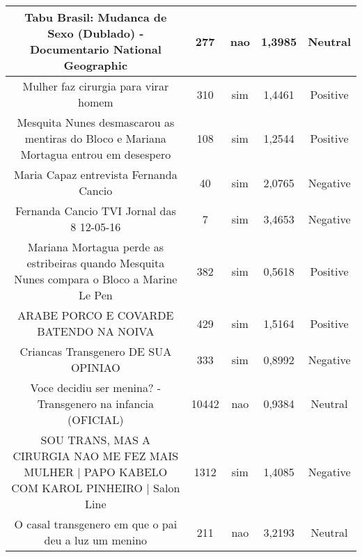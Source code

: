 \documentclass[11pt]{article}
\newlength\mylength
\begin{document}
\begin{center}
\begin{longtable}{||C{.40\mylength}||C{.20\mylength}||C{.20\mylength}||C{.30\mylength}||C{.20\mylength}||}
   Tabu Brasil: Mudanca de Sexo (Dublado) - Documentario National Geographic  & 277 & nao & 1,3985 & Neutral \\  \hline
   Mulher faz cirurgia para virar homem  & 310 & sim & 1,4461 & Positive \\  \hline
    Mesquita Nunes desmascarou as mentiras do Bloco e Mariana Mortagua entrou em desespero  & 108 & sim & 1,2544 & Positive \\  \hline
   Maria Capaz entrevista Fernanda Cancio  & 40 & sim & 2,0765 & Negative \\  \hline
  Fernanda Cancio TVI Jornal das 8 12-05-16  & 7 & sim & 3,4653 & Negative \\  \hline
  Mariana Mortagua perde as estribeiras quando Mesquita Nunes compara o Bloco a Marine Le Pen  & 382 & sim & 0,5618 & Positive \\  \hline
  ARABE PORCO E COVARDE BATENDO NA NOIVA & 429 & sim & 1,5164 & Positive \\  \hline
  Criancas Transgenero DE SUA OPINIAO & 333 & sim & 0,8992 & Negative \\  \hline
  Voce decidiu ser menina? - Transgenero na infancia (OFICIAL) & 10442 & nao & 0,9384 & Neutral \\  \hline
  SOU TRANS, MAS A CIRURGIA NAO ME FEZ MAIS MULHER | PAPO KABELO COM KAROL PINHEIRO | Salon Line & 1312 & sim & 1,4085 & Negative \\  \hline
  O casal transgenero em que o pai deu a luz um menino & 211 & nao & 3,2193 & Neutral \\  \hline

\end{longtable}
\end{center}
\end{document}
